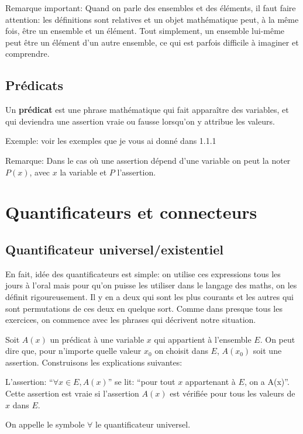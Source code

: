 \documentclass{article}
\begin{document}
Remarque important: Quand on parle des ensembles et des éléments, il faut faire attention: les définitions sont relatives et un objet mathématique peut, à la même fois, être un ensemble et un élément. Tout simplement, un ensemble lui-même peut être un élément d'un autre ensemble, ce qui est parfois difficile à imaginer et comprendre.

\subsection{Prédicats}

\begin{tcolorbox}[colback=red!5!white,colframe=red!75!black,title=Définition 1.3]
  Un \textbf{prédicat} est une phrase mathématique qui fait apparaître des variables, et qui deviendra une assertion vraie ou fausse lorsqu'on y attribue les valeurs.
\end{tcolorbox}

Exemple: voir les exemples que je vous ai donné dans 1.1.1

Remarque: Dans le cas où une assertion dépend d'une variable on peut la noter $P(x)$, avec $x$ la variable et $P$ l'assertion.

\section{Quantificateurs et connecteurs}
\subsection{Quantificateur universel/existentiel}

En fait, idée des quantificateurs est simple: on utilise ces expressions tous les jours à l'oral mais pour qu'on puisse les utiliser dans le langage des maths, on les définit rigoureusement. Il y en a deux qui sont les plus courants et les autres qui sont permutations de ces deux en quelque sort. Comme dans presque tous les exercices, on commence avec les phrases qui décrivent notre situation.

Soit $A(x)$ un prédicat à une variable $x$ qui appartient à l'ensemble $E$. On peut dire que, pour n'importe quelle valeur $x_{0}$ on choisit dans $E$, $A(x_{0})$ soit une assertion. Construisons les explications suivantes:

\begin{tcolorbox}[colback=red!5!white,colframe=red!75!black,title=Définition 1.4]

L'assertion: ``$\forall x \in E, A(x)$'' se lit: ``pour tout $x$ appartenant à $E$, on a A(x)''. Cette assertion est vraie si l'assertion $A(x)$ est vérifiée pour tous les valeurs de $x$ dans $E$.

\tcblower

On appelle le symbole $\forall$ le quantificateur universel.

\end{tcolorbox}
\end{document}
